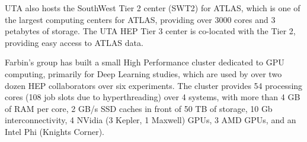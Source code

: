 UTA also hosts the SouthWest Tier 2 center (SWT2) for ATLAS, which is one of the largest computing centers for ATLAS, providing over 3000 cores and 3 petabytes of storage. The UTA HEP Tier 3 center is co-located with the Tier 2, providing easy access to ATLAS data.

Farbin's group has built a small High Performance cluster dedicated to
GPU computing, primarily for Deep Learning studies, which are used by
over two dozen HEP collaborators over six experiments. The cluster
provides 54 processing cores (108 job slots due to hyperthreading)
over 4 systems, with more than 4 GB of RAM per core, 2 GB/s SSD caches
in front of 50 TB of storage, 10 Gb interconnectivity, 4 NVidia (3
Kepler, 1 Maxwell) GPUs, 3 AMD GPUs, and an Intel Phi (Knights
Corner).
